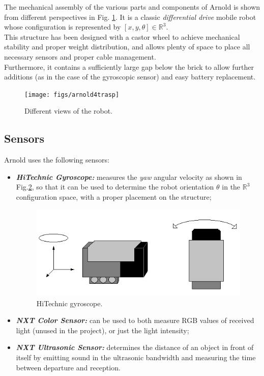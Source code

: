 \documentclass[a4paper,11pt,oneside]{book}
\begin{document}
		The mechanical assembly of the various parts and components of Arnold is shown from different perspectives in Fig. \ref{fig:arnold4trasp.png}.
		It is a classic \textit{differential drive} mobile robot whose configuration is represented by $[x,y, \theta] \in \mathbb{R}^3$.\\
		
		This structure has been designed with a castor wheel to achieve mechanical stability and proper weight distribution, and allows plenty of space to place all necessary sensors and proper cable management.\\
		Furthermore, it contains a sufficiently large gap below the brick to allow further additions (as in the case of the gyroscopic sensor) and easy battery replacement.
		
		\begin{figure}
			\centering
			\texttt{[image: figs/arnold4trasp]}
			\caption{Different views of the robot.}\label{fig:arnold4trasp.png}
		\end{figure}
		
		
		\subsection {Sensors}
		
		Arnold uses the following sensors:
		\begin{itemize}
			\item \textit{ \textbf {HiTechnic Gyroscope:}} measures the \textit{yaw} angular velocity as shown in Fig.\ref{fig:gyroscope.png}, so that it can be used to determine the robot orientation $\theta$ in the $\mathbb{R}^3$ configuration space, with a proper placement on the structure;
			\begin{figure}[H]
				\centering
				\includegraphics[scale=0.6]{figs/gyroscope}
				\caption{HiTechnic gyroscope.}\label{fig:gyroscope.png}
			\end{figure}
		
			\item \textit{\textbf {NXT Color Sensor:}} can be used to both measure RGB values of received light (unused in the project), or just the light intensity;
			
			\item \textit{\textbf {NXT Ultrasonic Sensor:}} determines the distance of an object in front of itself by emitting sound in the ultrasonic bandwidth and measuring the time between departure and reception.
			
		\end{itemize}
		
\end{document}
